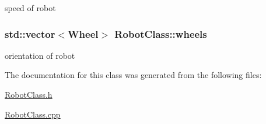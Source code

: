 speed of robot \hypertarget{classRobotClass_a52934dab5fdec48b101ad0c71fb60e48}{
\subsubsection[{wheels}]{\setlength{\rightskip}{0pt plus 5cm}std\-::vector$<${\bf Wheel}$>$ Robot\-Class\-::wheels\hspace{0.3cm}{\ttfamily [private]}}}\label{classRobotClass_a52934dab5fdec48b101ad0c71fb60e48}
orientation of robot 

The documentation for this class was generated from the following files\-:\begin{DoxyCompactItemize}
\item 
\hyperlink{RobotClass_8h}{Robot\-Class.\-h}\item 
\hyperlink{RobotClass_8cpp}{Robot\-Class.\-cpp}\end{DoxyCompactItemize}
